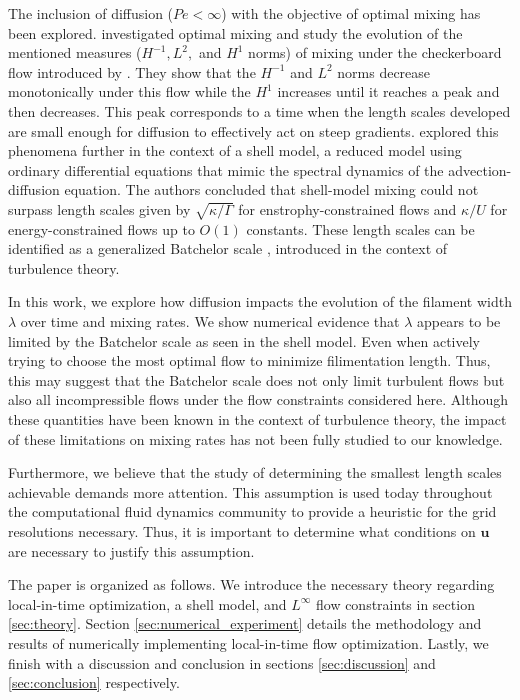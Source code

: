 \documentclass[12pt]{iopart}
\begin{document}
The inclusion of diffusion ($Pe <\infty$) with the objective of optimal mixing has been explored.  \cite{DF2014} investigated optimal mixing and study the evolution of the mentioned measures ($H^{-1}, L^2,$ and $H^1$ norms) of mixing under the checkerboard flow introduced by \cite{JMP2012}. They show that the $H^{-1}$ and $L^2$ norms decrease monotonically under this flow while the $H^{1}$ increases until it reaches a peak and then decreases. This peak corresponds to a  time when the length scales developed are small enough for diffusion to effectively act on steep gradients. \cite{Miles2017a} explored this phenomena further in the context of a shell model, a reduced model using ordinary differential equations that mimic the spectral dynamics of the advection-diffusion equation. The authors concluded that shell-model mixing could not surpass length scales given by $\sqrt{\kappa/ \Gamma}$ for enstrophy-constrained flows and $\kappa/U$ for energy-constrained flows up to $O(1)$ constants. These length scales can be identified as a generalized Batchelor scale \cite{Batchelor1959a}, introduced in the context of turbulence theory. 
 
 
In this work, we explore how diffusion impacts the evolution of the filament width $\lambda$ over time and mixing rates. We show numerical evidence that $\lambda$ appears to be limited by the Batchelor scale as seen in the shell model. Even when actively trying to choose the most optimal flow to minimize filimentation length. Thus, this may suggest that the Batchelor scale does not only limit turbulent flows but also all incompressible flows under the flow constraints considered here. Although these quantities have been known in the context of turbulence theory, the impact of these limitations on mixing rates has not been fully studied to our knowledge.

Furthermore, we believe that the study of determining the smallest length scales achievable demands more attention. This assumption is used today throughout the computational fluid dynamics community to provide a heuristic for the grid resolutions necessary. Thus, it is important to determine what conditions on $\mathbf{u}$ are necessary to justify this assumption.

The paper is organized as follows. We introduce the necessary theory regarding local-in-time optimization, a shell model, and $L^{\infty}$ flow constraints in section \ref{sec:theory}. Section \ref{sec:numerical_experiment} details the methodology and results of numerically implementing local-in-time flow optimization. Lastly, we finish with a discussion and conclusion in sections \ref{sec:discussion} and \ref{sec:conclusion} respectively.
\end{document}

